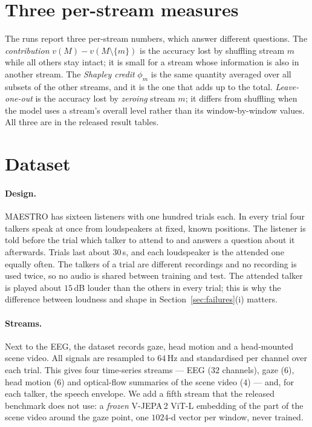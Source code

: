 \section{Three per-stream measures}
\label{app:perstream}

The runs report three per-stream numbers, which answer different questions. The
\emph{contribution} $v(M)-v(M\setminus\{m\})$ is the accuracy lost by shuffling
stream $m$ while all others stay intact; it is small for a stream whose
information is also in another stream. The \emph{Shapley credit} $\phi_m$ is the
same quantity averaged over all subsets of the other streams, and it is the one
that adds up to the total. \emph{Leave-one-out} is the accuracy lost by
\emph{zeroing} stream $m$; it differs from shuffling when the model uses a
stream's overall level rather than its window-by-window values. All three are in
the released result tables.

\section{Dataset}
\label{app:data}

\paragraph{Design.}
MAESTRO \citep{maestro2026} has sixteen listeners with one hundred trials each.
In every trial four talkers speak at once from loudspeakers at fixed, known
positions. The listener is told before the trial which talker to attend to and
answers a question about it afterwards. Trials last about $30$\,s, and each
loudspeaker is the attended one equally often. The talkers of a trial are
different recordings and no recording is used twice, so no audio is shared
between training and test. The attended talker is played about $15$\,dB louder
than the others in every trial; this is why the difference between loudness and
shape in Section~\ref{sec:failures}(i) matters.

\paragraph{Streams.}
Next to the EEG, the dataset records gaze, head motion and a head-mounted scene
video. All signals are resampled to $64$\,Hz and standardised per channel over
each trial. This gives four time-series streams --- EEG ($32$ channels), gaze
($6$), head motion ($6$) and optical-flow summaries of the scene video ($4$) ---
and, for each talker, the speech envelope. We add a fifth stream that the
released benchmark does not use: a \emph{frozen} V-JEPA\,2 ViT-L
\citep{assran2025vjepa2} embedding of the part of the scene video around the gaze
point, one $1024$-d vector per window, never trained.

